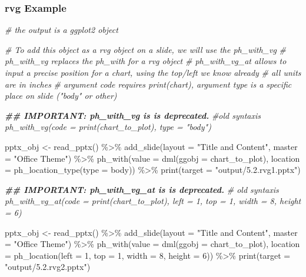\documentclass[
]{book}
\newenvironment{Shaded}{\begin{snugshade}}{\end{snugshade}}
\newcommand{\AttributeTok}[1]{\textcolor[rgb]{0.77,0.63,0.00}{#1}}
\newcommand{\CommentTok}[1]{\textcolor[rgb]{0.56,0.35,0.01}{\textit{#1}}}
\newcommand{\DecValTok}[1]{\textcolor[rgb]{0.00,0.00,0.81}{#1}}
\newcommand{\DocumentationTok}[1]{\textcolor[rgb]{0.56,0.35,0.01}{\textbf{\textit{#1}}}}
\newcommand{\FunctionTok}[1]{\textcolor[rgb]{0.00,0.00,0.00}{#1}}
\newcommand{\NormalTok}[1]{#1}
\newcommand{\OtherTok}[1]{\textcolor[rgb]{0.56,0.35,0.01}{#1}}
\newcommand{\SpecialCharTok}[1]{\textcolor[rgb]{0.00,0.00,0.00}{#1}}
\newcommand{\StringTok}[1]{\textcolor[rgb]{0.31,0.60,0.02}{#1}}
\begin{document}
\hypertarget{rvg-example}{%
\subsubsection{rvg Example}\label{rvg-example}}

\begin{Shaded}
\begin{Highlighting}[]
\CommentTok{\# the output is a ggplot2 object}

\CommentTok{\# To add this object as a rvg object on a slide, we will use the ph\_with\_vg}
\CommentTok{\# ph\_with\_vg replaces the ph\_with for a rvg object}
\CommentTok{\# ph\_with\_vg\_at allows to input a precise position for a chart, using the top/left we know already}
\CommentTok{\# all units are in inches}
\CommentTok{\# argument code requires print(chart), argument type is a specific place on slide ("body" or other)}


\DocumentationTok{\#\# IMPORTANT: ph\_with\_vg is is deprecated.}
\CommentTok{\#old syntaxis ph\_with\_vg(code = print(chart\_to\_plot), type = "body") }

\NormalTok{pptx\_obj }\OtherTok{\textless{}{-}} \FunctionTok{read\_pptx}\NormalTok{() }\SpecialCharTok{\%\textgreater{}\%}
  \FunctionTok{add\_slide}\NormalTok{(}\AttributeTok{layout =} \StringTok{"Title and Content"}\NormalTok{, }\AttributeTok{master =} \StringTok{"Office Theme"}\NormalTok{) }\SpecialCharTok{\%\textgreater{}\%}
  \FunctionTok{ph\_with}\NormalTok{(}\AttributeTok{value =} \FunctionTok{dml}\NormalTok{(}\AttributeTok{ggobj =}\NormalTok{ chart\_to\_plot), }\AttributeTok{location  =}  \FunctionTok{ph\_location\_type}\NormalTok{(}\AttributeTok{type =} \StringTok{\textquotesingle{}body\textquotesingle{}}\NormalTok{)) }\SpecialCharTok{\%\textgreater{}\%}
  \FunctionTok{print}\NormalTok{(}\AttributeTok{target =} \StringTok{"output/5.2.rvg1.pptx"}\NormalTok{) }

\DocumentationTok{\#\# IMPORTANT: ph\_with\_vg\_at is is deprecated.}
\CommentTok{\# old syntaxis ph\_with\_vg\_at(code = print(chart\_to\_plot), left = 1, top = 1, width = 8, height = 6) }

\NormalTok{pptx\_obj }\OtherTok{\textless{}{-}} \FunctionTok{read\_pptx}\NormalTok{() }\SpecialCharTok{\%\textgreater{}\%}
  \FunctionTok{add\_slide}\NormalTok{(}\AttributeTok{layout =} \StringTok{"Title and Content"}\NormalTok{, }\AttributeTok{master =} \StringTok{"Office Theme"}\NormalTok{) }\SpecialCharTok{\%\textgreater{}\%}
  \FunctionTok{ph\_with}\NormalTok{(}\AttributeTok{value =} \FunctionTok{dml}\NormalTok{(}\AttributeTok{ggobj =}\NormalTok{ chart\_to\_plot), }\AttributeTok{location =}  \FunctionTok{ph\_location}\NormalTok{(}\AttributeTok{left =} \DecValTok{1}\NormalTok{, }\AttributeTok{top =} \DecValTok{1}\NormalTok{, }\AttributeTok{width =} \DecValTok{8}\NormalTok{, }\AttributeTok{height =} \DecValTok{6}\NormalTok{))  }\SpecialCharTok{\%\textgreater{}\%}
  \FunctionTok{print}\NormalTok{(}\AttributeTok{target =} \StringTok{"output/5.2.rvg2.pptx"}\NormalTok{) }


\end{Highlighting}
\end{Shaded}
\end{document}
